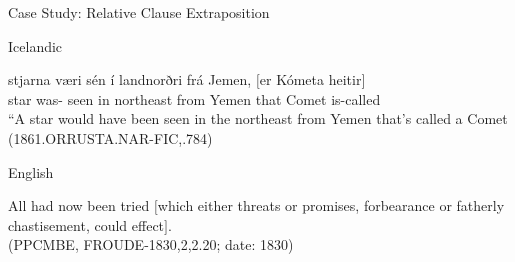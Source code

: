 \documentclass[hyperref={pdfpagelabels=false}]{beamer}
\begin{document}
\begin{frame}{Case Study: Relative Clause Extraposition}

	
\begin{block}{Icelandic}
		\begin{exe}
			\ex \gll stjarna væri sén í landnorðri frá Jemen, $[$er Kómeta heitir$]$\\
			star was- seen in northeast from Yemen that Comet is-called\\
			\quad ``A star would have been seen in the northeast from Yemen that's called a Comet\\
			(1861.ORRUSTA.NAR-FIC,.784)\\
		\end{exe}
	\end{block} 

	\begin{block}{English}
		\begin{exe}
			\ex All had now been tried $[$which either threats or promises, forbearance or
fatherly chastisement, could effect$]$.\\
			(PPCMBE, FROUDE-1830,2,2.20; date: 1830)
		\end{exe}
	\end{block}



\end{frame}




\end{document}
